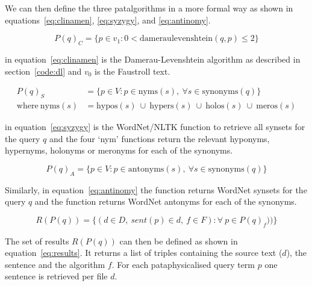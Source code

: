 We can then define the three patalgorithms in a more formal way as shown in equations~\ref{eq:clinamen}, \ref{eq:syzygy}, and \ref{eq:antinomy}.

\begin{equation}
  P(q)_C = \{p \in v_1: 0 < \text{dameraulevenshtein}(q,p) \leq 2\}
  \label{eq:clinamen}
\end{equation}

 in equation~\ref{eq:clinamen}\marginnote{$\bm{\Sigma}$~\ref{eq:clinamen}} is the Damerau-Levenshtein algorithm as described in section~\ref{code:dl} and $v_0$ is the Faustroll text.

\begin{equation}
  \begin{split}
    P(q)_S &= \{p \in V: p \in \text{nyms}(s), \ \forall s \in \text{synonyms}(q)\}\\
    \text{where} \ \text{nyms}(s) &= \text{hypos}(s) \ \cup \ \text{hypers}(s) \ \cup \ \text{holos}(s) \ \cup \ \text{meros}(s)
  \end{split}
  \label{eq:syzygy}
\end{equation}

 in equation~\ref{eq:syzygy}\marginnote{$\bm{\Sigma}$~\ref{eq:syzygy}} is the WordNet/\ac{NLTK} function to retrieve all synsets for the query $q$ and the four `nym' functions return the relevant hyponyms, hypernyms, holonyms or meronyms for each of the synonyms.

\begin{equation}
  P(q)_A = \{p \in V: p \in \text{antonyms}(s), \ \forall s \in \text{synonyms}(q)\}
  \label{eq:antinomy}
\end{equation}

Similarly, in equation~\ref{eq:antinomy}\marginnote{$\bm{\Sigma}$~\ref{eq:antinomy}} the  function returns WordNet synsets for the query $q$ and the  function returns WordNet antonyms for each of the synonyms.

\begin{equation}
  R(P(q)) = \{(d \in D, \ sent(p) \in d, \ f \in F): \forall \ p \in P(q)_f)) \}
  \label{eq:results}
\end{equation}

The set of results $R(P(q))$ can then be defined as shown in equation~\ref{eq:results}\marginnote{$\bm{\Sigma}$~\ref{eq:results}}. It returns a list of triples containing the source text ($d$), the sentence  and the algorithm $f$. For each pataphysicalised query term $p$ one sentence is retrieved per file $d$.


